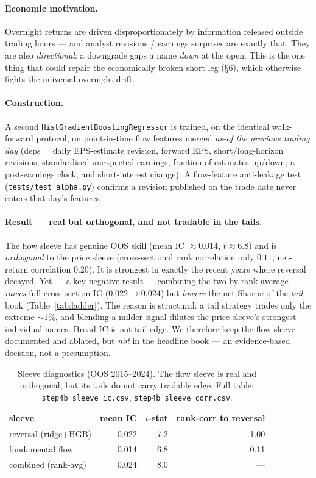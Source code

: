 \documentclass[11pt,a4paper]{article}
\newcommand{\code}[1]{\texttt{#1}}
\newcommand{\icEns}{0.022}
\newcommand{\icEnsT}{7.2}
\newcommand{\icFlow}{0.014}
\newcommand{\icFlowT}{6.8}
\newcommand{\icComb}{0.024}
\newcommand{\sleeveCorr}{0.11}
\newcommand{\sleeveRetCorr}{0.20}
\begin{document}
\paragraph{Economic motivation.} Overnight returns are driven disproportionately by information released
outside trading hours --- and analyst revisions / earnings surprises are exactly that. They are also
\emph{directional}: a downgrade gaps a name \emph{down} at the open. This is the one thing that could repair the
economically broken short leg (\S6), which otherwise fights the universal overnight drift.
\paragraph{Construction.} A second \code{HistGradientBoostingRegressor} is trained, on the identical
walk-forward protocol, on point-in-time flow features merged \emph{as-of the previous trading day} (deps =
daily EPS-estimate revision, forward EPS, short/long-horizon revisions, standardised unexpected earnings,
fraction of estimates up/down, a post-earnings clock, and short-interest change). A flow-feature anti-leakage
test (\code{tests/test\_alpha.py}) confirms a revision published on the trade date never enters that day's
features.
\paragraph{Result --- real but orthogonal, and not tradable in the tails.} The flow sleeve has genuine OOS
skill (mean IC $\approx\icFlow$, $t\approx\icFlowT$) and is \emph{orthogonal} to the price sleeve
(cross-sectional rank correlation only $\sleeveCorr$; net-return correlation $\sleeveRetCorr$). It is strongest
in exactly the recent years where reversal decayed. Yet --- a key negative result --- combining the two by
rank-average \emph{raises} full-cross-section IC ($\icEns\to\icComb$) but \emph{lowers} the net Sharpe of the
\emph{tail} book (Table~\ref{tab:ladder}). The reason is structural: a tail strategy trades only the extreme
$\sim1\%$, and blending a milder signal dilutes the price sleeve's strongest individual names. Broad IC is not
tail edge. We therefore keep the flow sleeve documented and ablated, but \emph{not} in the headline book ---
an evidence-based decision, not a presumption.

\begin{table}[h]\centering\small
\caption{Sleeve diagnostics (OOS 2015--2024). The flow sleeve is real and orthogonal, but its tails do not
carry tradable edge. Full table: \code{step4b\_sleeve\_ic.csv}, \code{step4b\_sleeve\_corr.csv}.}
\begin{tabular}{lrrr}
\toprule
sleeve & mean IC & $t$-stat & rank-corr to reversal\\
\midrule
reversal (ridge+HGB) & \icEns & \icEnsT & 1.00\\
fundamental flow & \icFlow & \icFlowT & \sleeveCorr\\
combined (rank-avg) & \icComb & 8.0 & ---\\
\bottomrule
\end{tabular}
\end{table}
\end{document}
